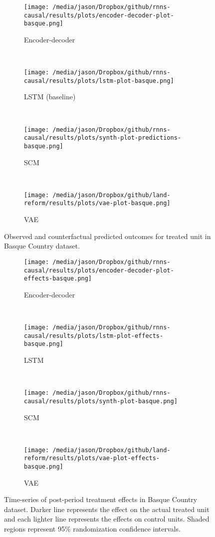 \documentclass[12pt]{article}
\begin{document}
\begin{figure*}[htbp] %
    \centering
    \begin{subfigure}[t]{0.5\textwidth}
        \centering
        \texttt{[image: /media/jason/Dropbox/github/rnns-causal/results/plots/encoder-decoder-plot-basque.png]}
        \caption{Encoder-decoder}
    \end{subfigure}%
        ~ 
    \begin{subfigure}[t]{0.5\textwidth}
        \centering
        \texttt{[image: /media/jason/Dropbox/github/rnns-causal/results/plots/lstm-plot-basque.png]}
        \caption{LSTM (baseline)}
    \end{subfigure}
        ~ 
    \begin{subfigure}[t]{0.5\textwidth}
        \centering
        \texttt{[image: /media/jason/Dropbox/github/rnns-causal/results/plots/synth-plot-predictions-basque.png]}
        \caption{SCM}
    \end{subfigure}%
        ~ 
    \begin{subfigure}[t]{0.5\textwidth}
		\centering
		\texttt{[image: /media/jason/Dropbox/github/land-reform/results/plots/vae-plot-basque.png]}
		\caption{VAE}
	\end{subfigure}
    \caption{Observed and counterfactual predicted outcomes for treated unit in Basque Country dataset.\label{basque-plot}}
\end{figure*}

\begin{figure*}[htbp]
	\centering
	\begin{subfigure}[t]{0.5\textwidth}
		\centering
		\texttt{[image: /media/jason/Dropbox/github/rnns-causal/results/plots/encoder-decoder-plot-effects-basque.png]}
		\caption{Encoder-decoder}
	\end{subfigure}%
	~ 
	\begin{subfigure}[t]{0.5\textwidth}
		\centering
		\texttt{[image: /media/jason/Dropbox/github/rnns-causal/results/plots/lstm-plot-effects-basque.png]}
		\caption{LSTM}
	\end{subfigure}
	~ 
	\begin{subfigure}[t]{0.5\textwidth}
		\centering
		\texttt{[image: /media/jason/Dropbox/github/rnns-causal/results/plots/synth-plot-basque.png]}
		\caption{SCM}
	\end{subfigure}%
	~ 
	\begin{subfigure}[t]{0.5\textwidth}
		\centering
		\texttt{[image: /media/jason/Dropbox/github/land-reform/results/plots/vae-plot-effects-basque.png]}
		\caption{VAE}
	\end{subfigure}
	\caption{Time-series of post-period treatment effects in Basque Country dataset. Darker line represents the effect on the actual treated unit and each lighter line represents the effects on control units. Shaded regions represent 95\% randomization confidence intervals. \label{basque-plot-effects}}
\end{figure*}
\end{document}
